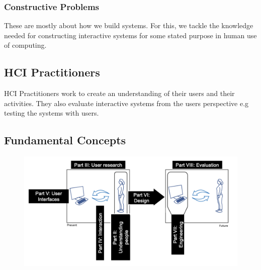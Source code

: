 \documentclass{article}
\begin{document}
\subsubsection*{Constructive Problems}
These are mostly about how we build systems. For this, we tackle the knowledge needed for constructing interactive systems for some stated purpose in human use of computing.
\subsection{HCI Practitioners}
HCI Practitioners work to create an understanding of their users and their activities. They also evaluate interactive systems from the users perspective e.g testing the systems with users. 
\subsection{Fundamental Concepts}
\begin{figure}[H]
    \centering
    \includegraphics[width=0.8\linewidth]{Pictures/Screenshot 2023-02-17 at 12.17.25.png}
\end{figure}
\end{document}
